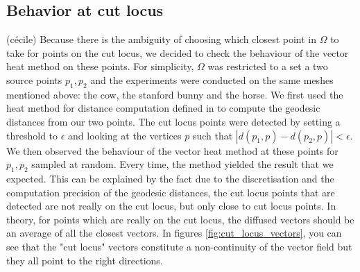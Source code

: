 \documentclass[sigconf]{acmart}
\begin{document}
\subsection{Behavior at cut locus}
(cécile)
Because there is the ambiguity of choosing which closest point in $\Omega$ to take for points on the cut locus, we decided to check 
the behaviour of the vector heat method on these points. For simplicity, $\Omega$ was restricted to a set a two source points $p_1, p_2$ and 
the experiments were conducted on the same meshes mentioned above: the cow, the stanford bunny and the horse. We first used the heat method for 
distance computation defined in \cite{crane_geodesics_2013} to compute the geodesic distances from our two points. The cut locus
points were detected by setting a threshold to $\epsilon$ and looking at the vertices $p$ such that $|d(p_1, p) - d(p_2, p)|<\epsilon$. We then 
observed the behaviour of the vector heat method at these points for $p_1, p_2$ sampled at random. Every time, the method yielded the result that 
we expected. This can be explained by the fact due to the discretisation and the computation precision of the geodesic distances, the cut locus 
points that are detected are not really on the cut locus, but only close to cut locus points. In theory, for points which are really on the cut 
locus, the diffused vectors should be an average of all the closest vectors. In figures \ref{fig:cut_locus_vectors}, you can see that
the "cut locus" vectors constitute a non-continuity of the vector field but they all point to the right directions. 
\end{document}
